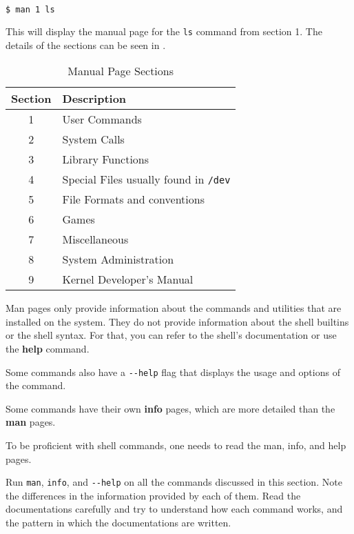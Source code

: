 \begin{lstlisting}[language=bash]
  $ man 1 ls
\end{lstlisting}

This will display the manual page for the \lstinline|ls| command from section 1. The details of the sections can be seen in .

\begin{table}[h!]
\caption{Manual Page Sections}
\begin{tabular}{ c l }
  \toprule
 Section & Description \\
 \midrule
  1 & User Commands \\
  2 & System Calls \\
  3 & Library Functions \\
  4 & Special Files usually found in \lstinline|/dev| \\
  5 & File Formats and conventions \\
  6 & Games \\
  7 & Miscellaneous \\
  8 & System Administration \\
  9 & Kernel Developer's Manual \\
  \bottomrule
\end{tabular}
\end{table}

Man pages only provide information about the commands and utilities that are installed on the system. They do not provide information about the shell builtins or the shell syntax. For that, you can refer to the shell's documentation or use the \textbf{help} command.

Some commands also have a \lstinline|--help| flag that displays the usage and options of the command.

Some commands have their own \textbf{info} pages, which are more detailed than the \textbf{man} pages.

To be proficient with shell commands, one needs to read the man, info, and help pages.

\begin{exercise}
  Run \lstinline|man|, \lstinline|info|, and \lstinline|--help| on all the commands discussed in this section.
  Note the differences in the information provided by each of them.
  Read the documentations carefully and try to understand how each command works, and the pattern in which the documentations are written.
\end{exercise}

